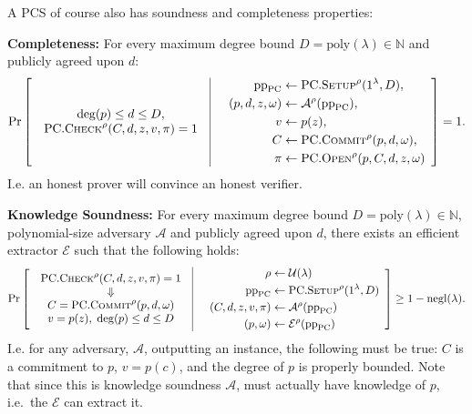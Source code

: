\documentclass[
]{article}
\newcommand*\Nb{\mathbb{N}}
\newcommand*\Ac{\mathcal{A}}
\newcommand*\Ec{\mathcal{E}}
\newcommand*\Uc{\mathcal{U}}
\renewcommand*\l{\lambda}
\renewcommand*\o{\omega}
\newcommand*{\negl}{\text{negl}}
\newcommand*{\poly}{\text{poly}}
\newcommand*{\pp}{\mathrm{pp}}
\newcommand*{\Setup}{\mathrm{\text{S{\scriptsize ETUP}}}}
\newcommand*{\Commit}{\mathrm{\text{C{\scriptsize OMMIT}}}}
\newcommand*{\PC}{\text{PC}}
\newcommand*{\PCSetup}{\PC.\Setup}
\newcommand*{\PCCommit}{\PC.\Commit}
\newcommand*{\PCOpen}{\PC.\mathrm{\text{O\scriptsize PEN}}}
\newcommand*{\PCCheck}{\PC.\mathrm{\text{C\scriptsize HECK}}}
\begin{document}
A PCS of course also has soundness and completeness properties:

\textbf{Completeness:} For every maximum degree bound
\(D = \poly(\l) \in \Nb\) and publicly agreed upon \(d\): \[
\Pr \left[
  \begin{array}{c|c}
    \begin{array}{c}
      \deg(p) \leq d \leq D, \\
      \PCCheck^\rho(C, d, z, v, \pi) = 1
    \end{array}
  & \quad
    \begin{aligned}
      \pp_\PC       &\leftarrow \PCSetup^\rho(1^\l, D), \\
      (p, d, z, \o) &\leftarrow \Ac^\rho(\pp_\PC), \\
      v             &\leftarrow p(z), \\
      C             &\leftarrow \PCCommit^\rho(p, d, \o), \\
      \pi           &\leftarrow \PCOpen^\rho(p, C, d, z, \o)
    \end{aligned}
  \end{array}
\right] = 1.
\] I.e. an honest prover will convince an honest verifier.

\textbf{Knowledge Soundness:} For every maximum degree bound
\(D = \poly(\l)
\in \Nb\), polynomial-size adversary \(\Ac\) and publicly agreed upon
\(d\), there exists an efficient extractor \(\Ec\) such that the
following holds: \[
\Pr \left[
  \begin{array}{c|c}
    \begin{array}{c}
      \PCCheck^\rho(C, d, z, v, \pi) = 1 \\
      \Downarrow \\
      C = \PCCommit^\rho(p, d, \o) \\
      v = p(z), \; \deg(p) \leq d \leq D
    \end{array}
  & \quad
    \begin{aligned}
      \rho              &\leftarrow \Uc(\l) \\
      \pp_\PC           &\leftarrow \PCSetup^\rho(1^\l, D) \\
      (C, d, z, v, \pi) &\leftarrow \Ac^\rho(\pp_\PC) \\
      (p, \o)           &\leftarrow \Ec^\rho(\pp_\PC) \\
    \end{aligned}
  \end{array}
\right] \geq 1 - \negl(\lambda).
\] I.e. for any adversary, \(\Ac\), outputting an instance, the
following must be true: \(C\) is a commitment to \(p\), \(v = p(c)\),
and the degree of \(p\) is properly bounded. Note that since this is
knowledge soundness \(\Ac\), must actually have knowledge of \(p\),
i.e.~the \(\Ec\) can extract it.
\end{document}
